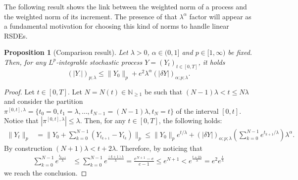 \documentclass[11pt,a4paper]{article}
\theoremstyle{plain}
\newtheorem{prop}[defn]{Proposition}
\begin{document}
\begin{appendices}
 The following result shows the link between the weighted norm of a process and the weighted norm of its increment. The presence of that $\lambda^\alpha$ factor will appear as a fundamental motivation for choosing this kind of norms to handle linear RSDEs.
 
\begin{prop}[Comparison result] \label{prop:comparison}
    Let $\lambda>0$, $\alpha \in (0,1]$ and $p \in [1,\infty)$ be fixed. Then, for any $L^p$-integrable stochastic process $Y=(Y_t)_{t \in [0,T]}$, it holds \begin{equation*}
    (|Y_{\cdot}|)_{p;\lambda} \le \|Y_0\|_p+e^2\lambda^\alpha(|\delta Y|)_{\alpha;p;\lambda}.
\end{equation*}
\end{prop}
\begin{proof}
    Let $t \in [0,T]$. Let $N=N(t)\in\mathbb{N}_{\ge1}$ be such that $(N-1)\lambda < t\le N\lambda$ and consider the partition $\pi^{[0,t],\lambda}=\{t_0=0,t_1=\lambda,\dots,t_{N-1}=(N-1)\lambda,t_{N}=t\}$ of the interval $[0,t]$. Notice that $|\pi^{[0,t],\lambda}|\le\lambda$. Then, for any $t \in [0,T]$, the following holds: \begin{equation*}
        \begin{aligned}
        \|Y_t\|_p &= \|Y_0+\sum_{k=0}^{N-1}(Y_{t_{k+1}}-Y_{t_k})\|_p 
        \le \|Y_0\|_p e^{t/\lambda}+(|\delta Y|)_{\alpha;p;\lambda}  \left(\sum_{k=0}^{N-1}e^{t_{k+1}/\lambda} \right)\lambda^\alpha.
    \end{aligned}
    \end{equation*}
    By construction $(N+1)\lambda < t+2\lambda$. Therefore, by noticing that
    \begin{equation*} \label{eq:weightednormsinequalitywiththeexponentials}
        \begin{aligned}
            \sum_{k=0}^{N-1}e^{\frac{t_{k+1}}{\lambda}} &\le \sum_{k=0}^{N-1}e^{\frac{(k+1)\lambda}{\lambda}} = \frac{e^{N+1}-e}{e-1} \le e^{N+1} < e^\frac{t+2\lambda}{\lambda} = e^2 e^{\frac{t}{\lambda}}
        \end{aligned} 
    \end{equation*} we reach the conclusion. 
\end{proof}


\end{appendices}
\end{document}
